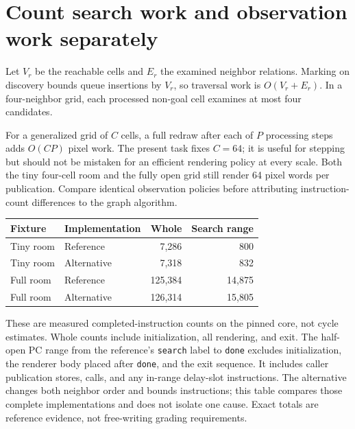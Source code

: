 \section{Count search work and observation work separately}\label{maze-x-cost}
Let \(V_r\) be the reachable cells and \(E_r\) the examined neighbor relations.
Marking on discovery bounds queue insertions by \(V_r\), so traversal work is
\(O(V_r+E_r)\). In a four-neighbor grid, each processed non-goal cell examines at most
four candidates.

For a generalized grid of \(C\) cells, a full redraw after each of \(P\) processing
steps adds \(O(CP)\) pixel work. The present task fixes \(C=64\); it is useful for
stepping but should not be mistaken for an efficient rendering policy at every scale.
Both the tiny four-cell room and the fully open grid still render 64 pixel words per
publication. Compare identical observation policies before attributing instruction-count
differences to the graph algorithm.

\begin{longtable}{@{}p{30mm}p{34mm}rr@{}}
  \toprule
  Fixture   & Implementation & Whole   & Search range \\\midrule\endhead
  Tiny room & Reference      & 7,286   & 800          \\
  Tiny room & Alternative    & 7,318   & 832          \\
  Full room & Reference      & 125,384 & 14,875       \\
  Full room & Alternative    & 126,314 & 15,805       \\
  \bottomrule
\end{longtable}
These are measured completed-instruction counts on the pinned core, not cycle estimates.
Whole counts include initialization, all rendering, and exit. The half-open PC range
from the reference's \texttt{search} label to \texttt{done} excludes initialization,
the renderer body placed after \texttt{done}, and the exit sequence. It includes caller
publication stores, calls, and any in-range delay-slot instructions. The alternative
changes both neighbor order and bounds instructions; this table compares those complete
implementations and does not isolate one cause. Exact totals are reference evidence,
not free-writing grading requirements.

